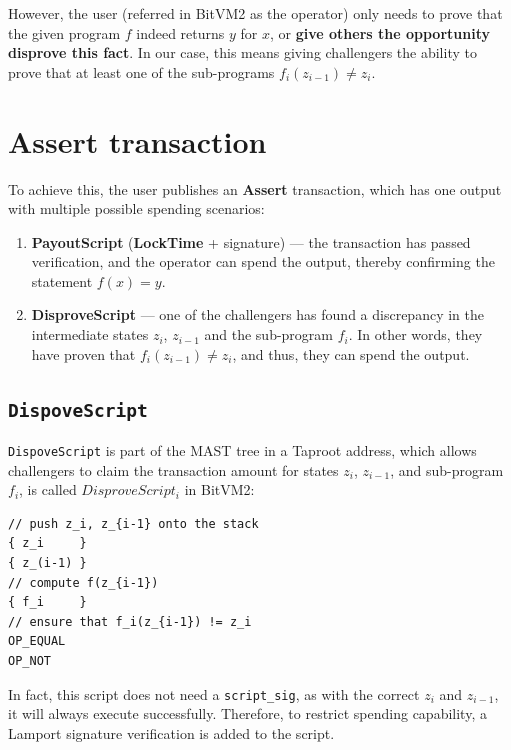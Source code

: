 \documentclass[11pt]{article}
\begin{document}
However, the user (referred in BitVM2 as the operator) only needs to
prove that the given program \(f\) indeed returns \(y\) for \(x\), or
\textbf{give others the opportunity disprove this fact}. In our case,
this means giving challengers the ability to prove that at least one
of the sub-programs \(f_i(z_{i-1}) \neq z_i\).

\section{\textbf{Assert} transaction}\label{sec:assert-tx}

To achieve this, the user publishes an \textbf{Assert} transaction,
which has one output with multiple possible spending scenarios:

\begin{enumerate}
  \item \textbf{PayoutScript} (\textbf{LockTime} + signature) --- the
    transaction has passed verification, and the operator can spend the
    output, thereby confirming the statement \(f(x) = y\).
  \item \textbf{DisproveScript} --- one of the challengers has found a
    discrepancy in the intermediate states \(z_i\), \(z_{i-1}\) and the
    sub-program \(f_i\). In other words, they have proven that
    \(f_i(z_{i-1}) \neq z_i\), and thus, they can spend the output.
\end{enumerate}

\subsection{\texttt{DispoveScript}}\label{sec:dispove-script}

\texttt{DispoveScript} is part of the MAST tree in a Taproot address,
which allows challengers to claim the transaction amount for states
\(z_i\), \(z_{i-1}\), and sub-program \(f_i\), is called
\(DisproveScript_i\) in BitVM2:

\begin{verbatim}
// push z_i, z_{i-1} onto the stack
{ z_i     }
{ z_(i-1) }
// compute f(z_{i-1})
{ f_i     }
// ensure that f_i(z_{i-1}) != z_i
OP_EQUAL
OP_NOT
\end{verbatim}

In fact, this script does not need a \texttt{script\_sig}, as with the
correct \(z_i\) and \(z_{i-1}\), it will always execute
successfully. Therefore, to restrict spending capability, a Lamport
signature verification is added to the script.
\end{document}
